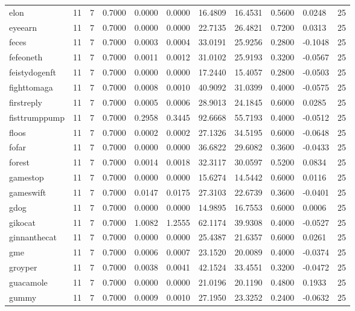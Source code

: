 \begin{table}[htbp]
\begin{tabular}{lllllllllll}
elon & 11 & 7 & 0.7000 & 0.0000 & 0.0000 & 16.4809 & 16.4531 & 0.5600 & 0.0248 & 25 \\
eyeearn & 11 & 7 & 0.7000 & 0.0000 & 0.0000 & 22.7135 & 26.4821 & 0.7200 & 0.0313 & 25 \\
feces & 11 & 7 & 0.7000 & 0.0003 & 0.0004 & 33.0191 & 25.9256 & 0.2800 & -0.1048 & 25 \\
fefeoneth & 11 & 7 & 0.7000 & 0.0011 & 0.0012 & 31.0102 & 25.9193 & 0.3200 & -0.0567 & 25 \\
feistydogenft & 11 & 7 & 0.7000 & 0.0000 & 0.0000 & 17.2440 & 15.4057 & 0.2800 & -0.0503 & 25 \\
fighttomaga & 11 & 7 & 0.7000 & 0.0008 & 0.0010 & 40.9092 & 31.0399 & 0.4000 & -0.0575 & 25 \\
firstreply & 11 & 7 & 0.7000 & 0.0005 & 0.0006 & 28.9013 & 24.1845 & 0.6000 & 0.0285 & 25 \\
fisttrumppump & 11 & 7 & 0.7000 & 0.2958 & 0.3445 & 92.6668 & 55.7193 & 0.4000 & -0.0512 & 25 \\
floos & 11 & 7 & 0.7000 & 0.0002 & 0.0002 & 27.1326 & 34.5195 & 0.6000 & -0.0648 & 25 \\
fofar & 11 & 7 & 0.7000 & 0.0000 & 0.0000 & 36.6822 & 29.6082 & 0.3600 & -0.0433 & 25 \\
forest & 11 & 7 & 0.7000 & 0.0014 & 0.0018 & 32.3117 & 30.0597 & 0.5200 & 0.0834 & 25 \\
gamestop & 11 & 7 & 0.7000 & 0.0000 & 0.0000 & 15.6274 & 14.5442 & 0.6000 & 0.0116 & 25 \\
gameswift & 11 & 7 & 0.7000 & 0.0147 & 0.0175 & 27.3103 & 22.6739 & 0.3600 & -0.0401 & 25 \\
gdog & 11 & 7 & 0.7000 & 0.0000 & 0.0000 & 14.9895 & 16.7553 & 0.6000 & 0.0006 & 25 \\
gikocat & 11 & 7 & 0.7000 & 1.0082 & 1.2555 & 62.1174 & 39.9308 & 0.4000 & -0.0527 & 25 \\
ginnanthecat & 11 & 7 & 0.7000 & 0.0000 & 0.0000 & 25.4387 & 21.6357 & 0.6000 & 0.0261 & 25 \\
gme & 11 & 7 & 0.7000 & 0.0006 & 0.0007 & 23.1520 & 20.0089 & 0.4000 & -0.0374 & 25 \\
groyper & 11 & 7 & 0.7000 & 0.0038 & 0.0041 & 42.1524 & 33.4551 & 0.3200 & -0.0472 & 25 \\
guacamole & 11 & 7 & 0.7000 & 0.0000 & 0.0000 & 21.0196 & 20.1190 & 0.4800 & 0.1933 & 25 \\
gummy & 11 & 7 & 0.7000 & 0.0009 & 0.0010 & 27.1950 & 23.3252 & 0.2400 & -0.0632 & 25 \\

\end{tabular}
\end{table}
